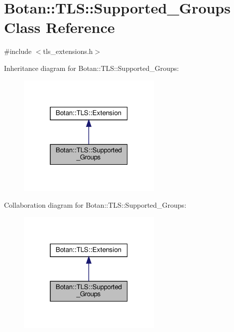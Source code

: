 \hypertarget{class_botan_1_1_t_l_s_1_1_supported___groups}{}\section{Botan\+:\+:T\+LS\+:\+:Supported\+\_\+\+Groups Class Reference}
\label{class_botan_1_1_t_l_s_1_1_supported___groups}


{\ttfamily \#include $<$tls\+\_\+extensions.\+h$>$}



Inheritance diagram for Botan\+:\+:T\+LS\+:\+:Supported\+\_\+\+Groups\+:
\nopagebreak
\begin{figure}[H]
\begin{center}
\leavevmode
\includegraphics[width=196pt]{class_botan_1_1_t_l_s_1_1_supported___groups__inherit__graph}
\end{center}
\end{figure}


Collaboration diagram for Botan\+:\+:T\+LS\+:\+:Supported\+\_\+\+Groups\+:
\nopagebreak
\begin{figure}[H]
\begin{center}
\leavevmode
\includegraphics[width=196pt]{class_botan_1_1_t_l_s_1_1_supported___groups__coll__graph}
\end{center}
\end{figure}
